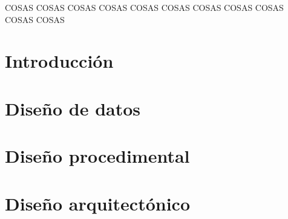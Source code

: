 
\HUGE COSAS
\HUGE COSAS
\HUGE COSAS
\HUGE COSAS
\HUGE COSAS
\HUGE COSAS
\HUGE COSAS
\HUGE COSAS
\HUGE COSAS
\HUGE COSAS
\HUGE COSAS

\section{Introducción}

\section{Diseño de datos}

\section{Diseño procedimental}

\section{Diseño arquitectónico}


